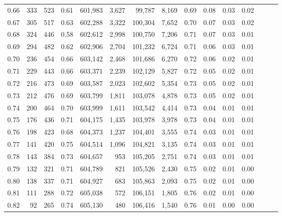 \begin{tabular}{rrrrrrrrrrrrrrr}
0.66 &     333 &    523 &  0.61 &  601,983 &    3,627 &   99,787 &    8,169 &  0.69 &  0.08 &  0.03 &      0.02 \\
0.67 &     305 &    517 &  0.63 &  602,288 &    3,322 &  100,304 &    7,652 &  0.70 &  0.07 &  0.03 &      0.02 \\
0.68 &     324 &    446 &  0.58 &  602,612 &    2,998 &  100,750 &    7,206 &  0.71 &  0.07 &  0.03 &      0.01 \\
0.69 &     294 &    482 &  0.62 &  602,906 &    2,704 &  101,232 &    6,724 &  0.71 &  0.06 &  0.03 &      0.01 \\
0.70 &     236 &    454 &  0.66 &  603,142 &    2,468 &  101,686 &    6,270 &  0.72 &  0.06 &  0.02 &      0.01 \\
0.71 &     229 &    443 &  0.66 &  603,371 &    2,239 &  102,129 &    5,827 &  0.72 &  0.05 &  0.02 &      0.01 \\
0.72 &     216 &    473 &  0.69 &  603,587 &    2,023 &  102,602 &    5,354 &  0.73 &  0.05 &  0.02 &      0.01 \\
0.73 &     212 &    476 &  0.69 &  603,799 &    1,811 &  103,078 &    4,878 &  0.73 &  0.05 &  0.02 &      0.01 \\
0.74 &     200 &    464 &  0.70 &  603,999 &    1,611 &  103,542 &    4,414 &  0.73 &  0.04 &  0.01 &      0.01 \\
0.75 &     176 &    436 &  0.71 &  604,175 &    1,435 &  103,978 &    3,978 &  0.73 &  0.04 &  0.01 &      0.01 \\
0.76 &     198 &    423 &  0.68 &  604,373 &    1,237 &  104,401 &    3,555 &  0.74 &  0.03 &  0.01 &      0.01 \\
0.77 &     141 &    420 &  0.75 &  604,514 &    1,096 &  104,821 &    3,135 &  0.74 &  0.03 &  0.01 &      0.01 \\
0.78 &     143 &    384 &  0.73 &  604,657 &      953 &  105,205 &    2,751 &  0.74 &  0.03 &  0.01 &      0.01 \\
0.79 &     132 &    321 &  0.71 &  604,789 &      821 &  105,526 &    2,430 &  0.75 &  0.02 &  0.01 &      0.00 \\
0.80 &     138 &    337 &  0.71 &  604,927 &      683 &  105,863 &    2,093 &  0.75 &  0.02 &  0.01 &      0.00 \\
0.81 &     111 &    288 &  0.72 &  605,038 &      572 &  106,151 &    1,805 &  0.76 &  0.02 &  0.01 &      0.00 \\
0.82 &      92 &    265 &  0.74 &  605,130 &      480 &  106,416 &    1,540 &  0.76 &  0.01 &  0.00 &      0.00 \\

\end{tabular}
